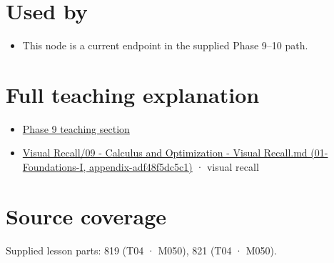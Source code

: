 \section{Used by}\label{appendix-e2d476574aab-used-by}

\begin{itemize}
\tightlist
\item
  This node is a current endpoint in the supplied Phase 9--10 path.
\end{itemize}

\section{Full teaching explanation}\label{appendix-e2d476574aab-full-teaching-explanation}

\begin{itemize}
\tightlist
\item
  \href{Continuous\%20Notes/Computing\%20Foundations\%20-\%20From\%20Bits\%20to\%20C++\%20and\%20Systems\%20APIs\#Multivariable\%20derivatives\%20and\%20sensitivity}{Phase 9 teaching section}
\item
  \href{../01-Foundations-I/main.pdf\#nameddest=appendix-adf48f5dc5c1}{Visual Recall/09 - Calculus and Optimization - Visual Recall.md (01-Foundations-I, appendix-adf48f5dc5c1)} · visual recall
\end{itemize}

\section{Source coverage}\label{appendix-e2d476574aab-source-coverage}

Supplied lesson parts: 819 (T04 · M050), 821 (T04 · M050).
